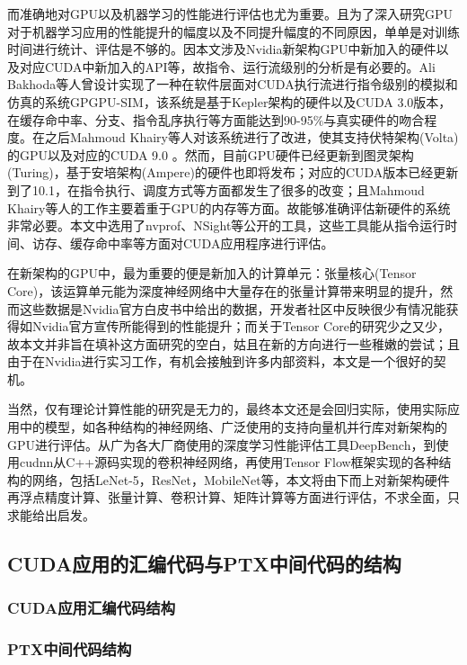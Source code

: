\par 而准确地对GPU以及机器学习的性能进行评估也尤为重要。且为了深入研究GPU对于机器学习应用的性能提升的幅度以及不同提升幅度的不同原因，单单是对训练时间进行统计、评估是不够的。因本文涉及Nvidia新架构GPU中新加入的硬件以及对应CUDA中新加入的API等，故指令、运行流级别的分析是有必要的。Ali Bakhoda等人曾设计实现了一种在软件层面对CUDA执行流进行指令级别的模拟和仿真的系统GPGPU-SIM，该系统是基于Kepler架构的硬件以及CUDA 3.0版本，在缓存命中率、分支、指令乱序执行等方面能达到90-95\%与真实硬件的吻合程度\parencite{GPGPUSIM}。在之后Mahmoud Khairy等人对该系统进行了改进，使其支持伏特架构(Volta)的GPU以及对应的CUDA 9.0 \parencite{GPGPUSIM2}。然而，目前GPU硬件已经更新到图灵架构(Turing)，基于安培架构(Ampere)的硬件也即将发布；对应的CUDA版本已经更新到了10.1，在指令执行、调度方式等方面都发生了很多的改变；且Mahmoud Khairy等人的工作主要着重于GPU的内存等方面。故能够准确评估新硬件的系统非常必要。本文中选用了nvprof、NSight等公开的工具，这些工具能从指令运行时间、访存、缓存命中率等方面对CUDA应用程序进行评估\parencite{NSIGHT}。
\par 在新架构的GPU中，最为重要的便是新加入的计算单元：张量核心(Tensor Core)，该运算单元能为深度神经网络中大量存在的张量计算带来明显的提升\parencite{VOLTAWHITEPAPER}，然而这些数据是Nvidia官方白皮书中给出的数据，开发者社区中反映很少有情况能获得如Nvidia官方宣传所能得到的性能提升；而关于Tensor Core的研究少之又少，故本文并非旨在填补这方面研究的空白，姑且在新的方向进行一些稚嫩的尝试；且由于在Nvidia进行实习工作，有机会接触到许多内部资料，本文是一个很好的契机。
\par 当然，仅有理论计算性能的研究是无力的，最终本文还是会回归实际，使用实际应用中的模型，如各种结构的神经网络、广泛使用的支持向量机并行库对新架构的GPU进行评估。从广为各大厂商使用的深度学习性能评估工具DeepBench\parencite{DEEPBENCH}，到使用cudnn从C++源码实现的卷积神经网络，再使用Tensor Flow框架实现的各种结构的网络，包括LeNet-5\parencite{LENET}，ResNet\parencite{RESNET}，MobileNet\parencite{MOBILE}等，本文将由下而上对新架构硬件再浮点精度计算、张量计算、卷积计算、矩阵计算等方面进行评估，不求全面，只求能给出启发。

\subsection{CUDA应用的汇编代码与PTX中间代码的结构}

\subsubsection{CUDA应用汇编代码结构}

\subsubsection{PTX中间代码结构}